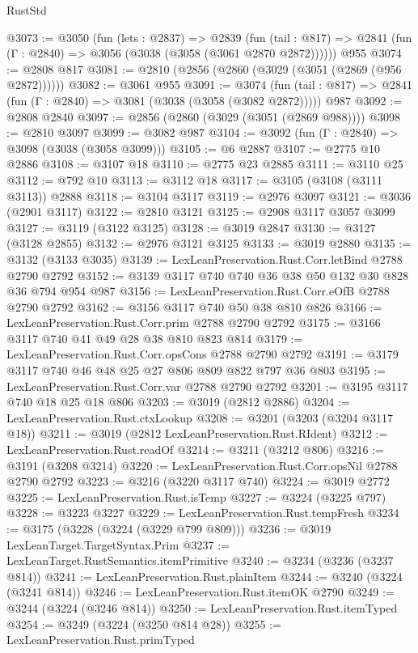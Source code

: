 \begin{lexlean}{RustStd}
\begin{coremodule}
@3073 := @3050
    (fun (lets : @2837) =>
    @2839
      (fun (tail : @817) => @2841 (fun (Γ : @2840) => @3056 (@3038 (@3058 (@3061 @2870 @2872))))))
    @955
@3074 := @2808 @817
@3081 := @2810 (@2856 (@2860 (@3029 (@3051 (@2869 (@956 @2872))))))
@3082 := @3061 @955
@3091 := @3074
    (fun (tail : @817) => @2841 (fun (Γ : @2840) => @3081 (@3038 (@3058 (@3082 @2872)))))
    @987
@3092 := @2808 @2840
@3097 := @2856 (@2860 (@3029 (@3051 (@2869 @988))))
@3098 := @2810 @3097
@3099 := @3082 @987
@3104 := @3092 (fun (Γ : @2840) => @3098 (@3038 (@3058 @3099)))
@3105 := @6 @2887
@3107 := @2775 @10 @2886
@3108 := @3107 @18
@3110 := @2775 @23 @2885
@3111 := @3110 @25
@3112 := @792 @10
@3113 := @3112 @18
@3117 := @3105 (@3108 (@3111 @3113)) @2888
@3118 := @3104 @3117
@3119 := @2976 @3097
@3121 := @3036 (@2901 @3117)
@3122 := @2810 @3121
@3125 := @2908 @3117 @3057 @3099
@3127 := @3119 (@3122 @3125)
@3128 := @3019 @2847
@3130 := @3127 (@3128 @2855)
@3132 := @2976 @3121 @3125
@3133 := @3019 @2880
@3135 := @3132 (@3133 @3035)
@3139 := LexLeanPreservation.Rust.Corr.letBind @2788 @2790 @2792
@3152 := @3139 @3117 @740 @740 @36 @38 @50 @132 @30 @828 @36 @794 @954 @987
@3156 := LexLeanPreservation.Rust.Corr.eOfB @2788 @2790 @2792
@3162 := @3156 @3117 @740 @50 @38 @810 @826
@3166 := LexLeanPreservation.Rust.Corr.prim @2788 @2790 @2792
@3175 := @3166 @3117 @740 @41 @49 @28 @38 @810 @823 @814
@3179 := LexLeanPreservation.Rust.Corr.opsCons @2788 @2790 @2792
@3191 := @3179 @3117 @740 @46 @48 @25 @27 @806 @809 @822 @797 @36 @803
@3195 := LexLeanPreservation.Rust.Corr.var @2788 @2790 @2792
@3201 := @3195 @3117 @740 @18 @25 @18 @806
@3203 := @3019 (@2812 @2886)
@3204 := LexLeanPreservation.Rust.ctxLookup
@3208 := @3201 (@3203 (@3204 @3117 @18))
@3211 := @3019 (@2812 LexLeanPreservation.Rust.RIdent)
@3212 := LexLeanPreservation.Rust.readOf
@3214 := @3211 (@3212 @806)
@3216 := @3191 (@3208 @3214)
@3220 := LexLeanPreservation.Rust.Corr.opsNil @2788 @2790 @2792
@3223 := @3216 (@3220 @3117 @740)
@3224 := @3019 @2772
@3225 := LexLeanPreservation.Rust.isTemp
@3227 := @3224 (@3225 @797)
@3228 := @3223 @3227
@3229 := LexLeanPreservation.Rust.tempFresh
@3234 := @3175 (@3228 (@3224 (@3229 @799 @809)))
@3236 := @3019 LexLeanTarget.TargetSyntax.Prim
@3237 := LexLeanTarget.RustSemantics.itemPrimitive
@3240 := @3234 (@3236 (@3237 @814))
@3241 := LexLeanPreservation.Rust.plainItem
@3244 := @3240 (@3224 (@3241 @814))
@3246 := LexLeanPreservation.Rust.itemOK @2790
@3249 := @3244 (@3224 (@3246 @814))
@3250 := LexLeanPreservation.Rust.itemTyped
@3254 := @3249 (@3224 (@3250 @814 @28))
@3255 := LexLeanPreservation.Rust.primTyped

\end{coremodule}
\end{lexlean}

